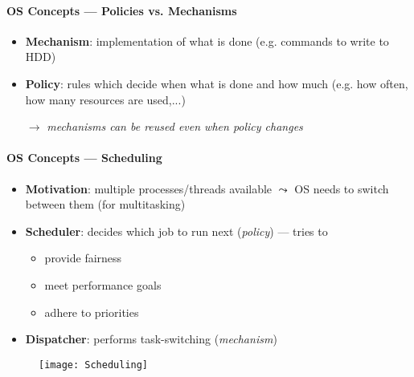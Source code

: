 \paragraph{OS Concepts --- Policies vs. Mechanisms}
\begin{itemize}
	\item \textbf{Mechanism}: implementation of what is done (e.g. commands to write to HDD)
	\item \textbf{Policy}: rules which decide when what is done and how much (e.g. how often, how many resources are used,...)
	\item[$ \to $] \emph{mechanisms can be reused even when policy changes}
\end{itemize}

\paragraph{OS Concepts --- Scheduling}
\begin{itemize}
	\item \textbf{Motivation}: multiple processes/threads available $ \leadsto $ OS needs to switch between them (for multitasking)
	\item \textbf{Scheduler}: decides which job to run next (\emph{policy}) --- tries to
	\begin{itemize}
		\item provide fairness
		\item meet performance goals
		\item adhere to priorities 
	\end{itemize}
	\item \textbf{Dispatcher}: performs task-switching (\emph{mechanism})
\end{itemize}
\begin{figure}[h]\centering\label{Scheduling}\texttt{[image: Scheduling]}\end{figure}

